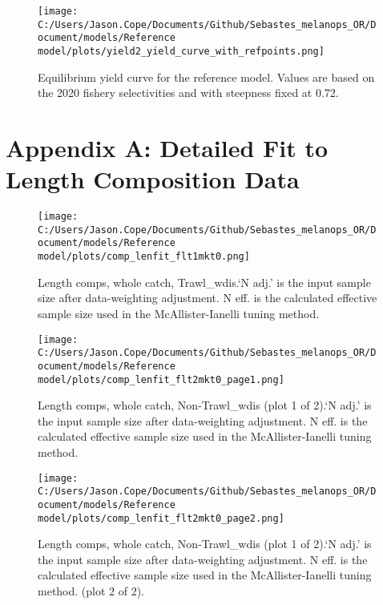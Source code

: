 \documentclass[11pt,
  english,
  letterpaper,
]{article}
\begin{document}
\begin{figure}
\centering
\texttt{[image: C:/Users/Jason.Cope/Documents/Github/Sebastes\_melanops\_OR/Document/models/Reference model/plots/yield2\_yield\_curve\_with\_refpoints.png]}
\caption{Equilibrium yield curve for the reference model. Values are based on the 2020 fishery selectivities and with steepness fixed at 0.72.\label{fig:yield}}
\end{figure}

\clearpage

\hypertarget{app-a}{%
\section{Appendix A: Detailed Fit to Length Composition Data}\label{app-a}}

\begin{figure}
\centering
\texttt{[image: C:/Users/Jason.Cope/Documents/Github/Sebastes\_melanops\_OR/Document/models/Reference model/plots/comp\_lenfit\_flt1mkt0.png]}
\caption{Length comps, whole catch, Trawl\_wdis.`N adj.' is the input sample size after data-weighting adjustment. N eff. is the calculated effective sample size used in the McAllister-Ianelli tuning method.\label{fig:comp_lenfit_flt1mkt0}}
\end{figure}

\begin{figure}
\centering
\texttt{[image: C:/Users/Jason.Cope/Documents/Github/Sebastes\_melanops\_OR/Document/models/Reference model/plots/comp\_lenfit\_flt2mkt0\_page1.png]}
\caption{Length comps, whole catch, Non-Trawl\_wdis (plot 1 of 2).`N adj.' is the input sample size after data-weighting adjustment. N eff. is the calculated effective sample size used in the McAllister-Ianelli tuning method.\label{fig:comp_lenfit_flt2mkt0_page1}}
\end{figure}

\begin{figure}
\centering
\texttt{[image: C:/Users/Jason.Cope/Documents/Github/Sebastes\_melanops\_OR/Document/models/Reference model/plots/comp\_lenfit\_flt2mkt0\_page2.png]}
\caption{Length comps, whole catch, Non-Trawl\_wdis (plot 1 of 2).`N adj.' is the input sample size after data-weighting adjustment. N eff. is the calculated effective sample size used in the McAllister-Ianelli tuning method. (plot 2 of 2).\label{fig:comp_lenfit_flt2mkt0_page2}}
\end{figure}
\end{document}
